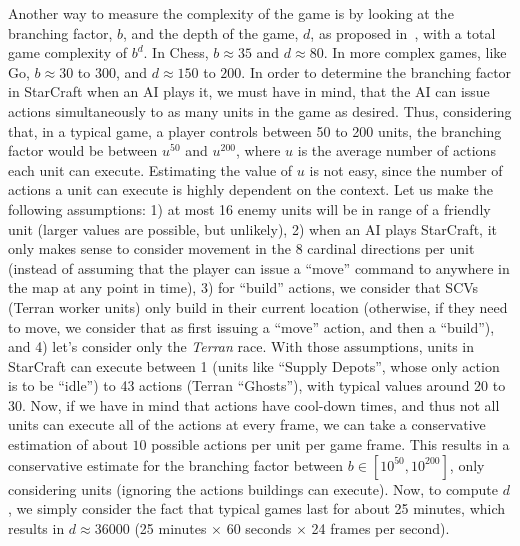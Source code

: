 \documentclass{llncs}
\begin{document}
Another way to measure the complexity of the game is by looking at the
branching factor,  $b$, and the  depth of  the game, $d$,  as proposed
in~\cite{Gaby}, with  a total game  complexity of $b^d$. In  Chess, $b
\approx 35$  and $d \approx  80$. In more  complex games, like  Go, $b
\approx  30$ to  $300$, and  $d  \approx 150$  to $200$.  In order  to
determine the  branching factor in StarCraft  when an AI plays  it, we
must have in mind, that the  AI can issue actions simultaneously to as
many  units in  the  game as  desired. Thus,  considering  that, in  a
typical game, a player controls between 50 to 200 units, the branching
factor  would be  between $u^{50}$  and  $u^{200}$, where  $u$ is  the
average number of actions each unit can execute.  Estimating the value
of $u$ is not easy, since the  number of actions a unit can execute is
highly  dependent   on  the  context.   Let  us  make   the  following
assumptions: 1) at most 16 enemy units  will be in range of a friendly
unit (larger values  are possible, but unlikely), 2) when  an AI plays
StarCraft, it only makes sense to  consider movement in the 8 cardinal
directions per unit  (instead of assuming that the player  can issue a
``move'' command to anywhere in the map  at any point in time), 3) for
``build'' actions,  we consider that  SCVs (Terran worker  units) only
build in their  current location (otherwise, if they need  to move, we
consider  that  as  first  issuing  a  ``move''  action,  and  then  a
``build''), and  4) let's  consider only the  {\em Terran}  race. With
those assumptions,  units in  StarCraft can  execute between  1 (units
like ``Supply  Depots'', whose only  action is  to be ``idle'')  to 43
actions (Terran ``Ghosts''), with typical values around 20 to 30. Now,
if we have in mind that actions have cool-down times, and thus not all
units can  execute all of  the actions at every  frame, we can  take a
conservative estimation  of about $10$  possible actions per  unit per
game frame. This results in  a conservative estimate for the branching
factor  between $b  \in  [10^{50},10^{200}]$,  only considering  units
(ignoring the actions buildings can execute).
Now, to  compute $d$, we simply  consider the fact that  typical games
last for  about 25  minutes, which  results in  $d \approx  36000$ (25
minutes $\times$ 60 seconds $\times$ 24 frames per second).
\end{document}
